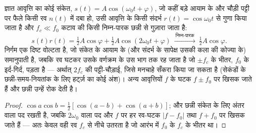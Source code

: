 \begin{proposition}[तुल्यकालिक (लॉक-इन) संसूचन]\label{prop:b2:feedback-oscillators:lockin}
ज्ञात आवृत्ति का कोई संकेत, $s(t) = A\cos(\omega_0t + \varphi)$, जो कहीं बड़े आयाम के
और चौड़ी पट्टी पर फैले किसी रव $n(t)$ में दबा हो, उसी आवृत्ति के किसी
संदर्भ $r(t) = \cos\omega_0t$ से गुणा किया जाता है
और $f_c \ll f_0$ कटाव की किसी निम्न-पारक छन्नी से गुज़ारा जाता है:
\[
s(t)r(t) = \tfrac12A\cos\varphi + \tfrac12A\cos(2\omega_0t + \varphi)
\ \xrightarrow{\ \text{निम्न-पारक}\ }\ \tfrac12A\cos\varphi .
\]
निर्गम एक दिष्ट वोल्टता है, जो संकेत के आयाम के (और संदर्भ के सापेक्ष उसकी
कला की कोज्या के) समानुपाती है, जबकि रव
घटकर उसके वर्णक्रम के उस भाग तक रह जाता है जो $\pm f_c$ के भीतर, $f_0$ के इर्द-गिर्द, पड़ता है
--- अर्थात् $2f_c$ की पट्टी-चौड़ाई, जिसे मनचाहे सँकरा किया जा सकता है (सेकंडों के
छन्नी-समय-नियतांक के लिए हर्ट्ज़ का कोई अंश)। अन्य
आवृत्तियों $f$ के घटक $f \pm f_0$ पर खिसक जाते हैं और छन्नी उन्हें रोक देती है।
\end{proposition}

\begin{proof}
$\cos a\cos b = \tfrac12[\cos(a - b) + \cos(a + b)]$; और छन्नी संकेत के लिए
अंतर वाला पद रखती है, जबकि $2\omega_0$ वाला पद और $f$ पर हर रव-घटक
$|f - f_0|$ तथा $f + f_0$ पर खिसक जाते हैं --- अतः केवल वही
रव $f_c$ से नीचे उतरता है जो आरंभ में $f_0$ के $f_c$ के भीतर था।
\end{proof}

